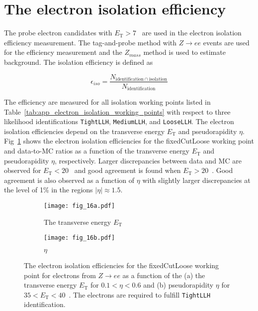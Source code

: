
\section{The electron isolation efficiency}
\label{sec:app_electron_isolation_efficiency}
The probe electron candidates with $E_\mathrm{T} > 7$~{\GeV} are used in the electron isolation efficiency measurement.
The tag-and-probe method with $Z \to ee$ events are used for the efficiency measurement and the $Z_{mass}$ method is used to estimate background.
The isolation efficiency is defined as

\begin{equation}
    \epsilon_{iso} = \frac{N_{\mathrm{identification} \cap \mathrm{isolation}}}{N_\mathrm{identification}}
\end{equation}

The efficiency are measured for all isolation working points listed in Table~\ref{tab:app_electron_isolation_working_points} with respect to three likelihood identifications \texttt{TightLLH}, \texttt{MediumLLH}, and \texttt{LooseLLH}.
The electron isolation efficiencies depend on the transverse energy $E_\mathrm{T}$ and pseudorapidity $\eta$.
Fig~\ref{fig:app_electron_isolation_isolation_plots} shows the electron isolation efficiencies for the fixedCutLoose working point and data-to-MC ratios as a function of the transverse energy $E_\mathrm{T}$ and pseudorapidity $\eta$, respectively.
Larger discrepancies between data and MC are observed for $E_\mathrm{T} < 20$~{\GeV} and good agreement is found when $E_\mathrm{T} > 20$~{\GeV}.
Good agreement is also observed as a function of $\eta$ with slightly larger discrepancies at the level of 1\% in the regions $|\eta| \approx 1.5$.

\begin{figure}[htbp]
    \begin{subfigure}[b]{0.48\textwidth}
        \begin{center}
            \texttt{[image: fig\_16a.pdf]}
            \caption{The transverse energy $E_\mathrm{T}$}
        \end{center}
    \end{subfigure}
    \begin{subfigure}[b]{0.48\textwidth}
        \begin{center}
            \texttt{[image: fig\_16b.pdf]}
            \caption{$\eta$}
        \end{center}
    \end{subfigure}
    \caption{The electron isolation efficiencies for the fixedCutLoose working point for electrons from $Z \to ee$ as a function of the (a) the transverse energy $E_\mathrm{T}$ for $0.1 < \eta < 0.6$ and (b) pseudorapidity $\eta$ for $35 < E_\mathrm{T} < 40$~{\GeV}.
    The electrons are required to fulfill \texttt{TightLLH} identification.}
    \label{fig:app_electron_isolation_isolation_plots}
\end{figure}
